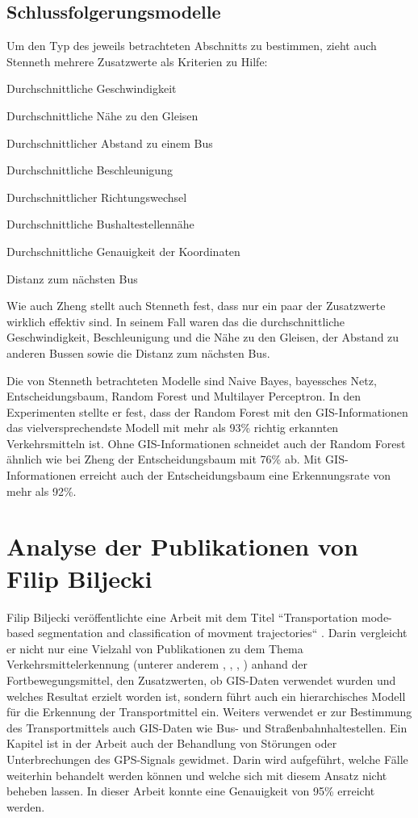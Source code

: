 \subsection{Schlussfolgerungsmodelle}
Um den Typ des jeweils betrachteten Abschnitts zu bestimmen, zieht auch Stenneth mehrere Zusatzwerte als Kriterien zu Hilfe:

\begin{pitemize}
\item Durchschnittliche Geschwindigkeit
\item Durchschnittliche Nähe zu den Gleisen
\item Durchschnittlicher Abstand zu einem Bus
\item Durchschnittliche Beschleunigung
\item Durchschnittlicher Richtungswechsel
\item Durchschnittliche Bushaltestellennähe
\item Durchschnittliche Genauigkeit der Koordinaten
\item Distanz zum nächsten Bus
\end{pitemize}

Wie auch Zheng stellt auch Stenneth fest, dass nur ein paar der Zusatzwerte wirklich effektiv sind. In seinem Fall waren das die durchschnittliche Geschwindigkeit, Beschleunigung und die Nähe zu den Gleisen, der Abstand zu anderen Bussen sowie die Distanz zum nächsten Bus.

Die von Stenneth betrachteten Modelle sind Naive Bayes, bayessches Netz, Entscheidungsbaum, Random Forest und Multilayer Perceptron. In den Experimenten stellte er fest, dass der Random Forest mit den GIS-Informationen das vielversprechendste Modell mit mehr als 93\% richtig erkannten Verkehrsmitteln ist. Ohne GIS-Informationen schneidet auch der Random Forest ähnlich wie bei Zheng der Entscheidungsbaum mit 76\% ab. Mit GIS-Informationen erreicht auch der Entscheidungsbaum eine Erkennungsrate von mehr als 92\%. 

\section{Analyse der Publikationen von Filip Biljecki}
Filip Biljecki veröffentlichte eine Arbeit mit dem Titel ``Transportation mode-based segmentation and classification of movment trajectories`` \cite{biljecki_transportation_2013}. Darin vergleicht er nicht nur eine Vielzahl von Publikationen zu dem Thema Verkehrsmittelerkennung (unterer anderem \cite{schuessler_processing_2009}, \cite{zheng_understanding_2010}, \cite{reddy_using_2010}, \cite{gonzalez_automating_2010}) anhand der Fortbewegungsmittel, den Zusatzwerten, ob GIS-Daten verwendet wurden und welches Resultat erzielt worden ist, sondern führt auch ein hierarchisches Modell für die Erkennung der Transportmittel ein. Weiters verwendet er zur Bestimmung des Transportmittels auch GIS-Daten wie Bus- und Straßenbahnhaltestellen. Ein Kapitel ist in der Arbeit auch der Behandlung von Störungen oder Unterbrechungen des GPS-Signals gewidmet. Darin wird aufgeführt, welche Fälle weiterhin behandelt werden können und welche sich mit diesem Ansatz nicht beheben lassen. In dieser Arbeit konnte eine Genauigkeit von 95\% erreicht werden.

